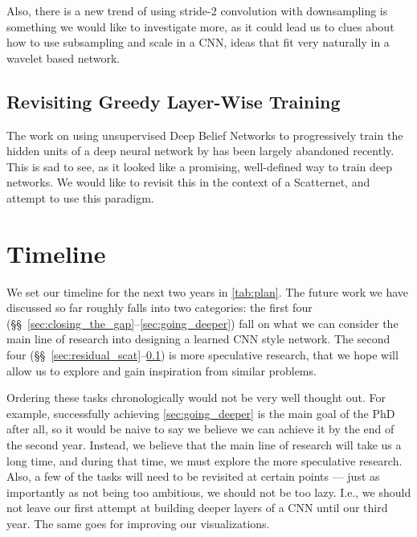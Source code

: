   Also, there is a new trend of using stride-2 convolution with downsampling is
  something we would like to investigate more, as it could lead us to clues
  about how to use subsampling and scale in a CNN, ideas that fit very
  naturally in a wavelet based network.

\subsection{Revisiting Greedy Layer-Wise Training}\label{sec:greedy_layerwise}
  The work on using unsupervised Deep Belief Networks to progressively train
  the hidden units of a deep neural network by \citet{bengio_greedy_2007} has
  been largely abandoned recently. This is sad to see, as it looked like
  a promising, well-defined way to train deep networks. We would like to
  revisit this in the context of a Scatternet, and attempt to use this
  paradigm.

\section{Timeline}
We set our timeline for the next two years in \autoref{tab:plan}. The future
work we have discussed so far roughly falls into two categories: the first four
(\S\S~\ref{sec:closing_the_gap}--\ref{sec:going_deeper}) fall on what we can
consider the  main line of research into designing a learned CNN style network.
The second four (\S\S~\ref{sec:residual_scat}--\ref{sec:greedy_layerwise}) is
more speculative research, that we hope will allow us to explore and gain
inspiration from similar problems.

Ordering these tasks chronologically would not be very well thought out. For example, 
successfully achieving \autoref{sec:going_deeper} is the main goal of the PhD
after all, so it would be naive to say we believe we can achieve it by the end
of the second year. Instead, we believe that the main line of research will take us 
a long time, and during that time, we must explore the more speculative
research. Also, a few of the tasks will need to be revisited at certain points
--- just as importantly as not being too ambitious, we should not be too lazy.
I.e., we should not leave our first attempt at building deeper layers of a CNN
until our third year. The same goes for improving our visualizations.

